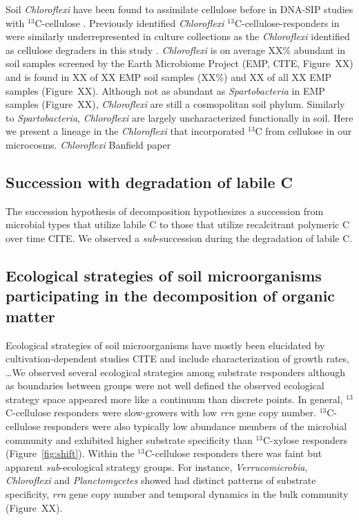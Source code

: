 Soil \textit{Chloroflexi} have been found to assimilate cellulose before in
DNA-SIP studies with $^{13}$C-cellulose \citep{Schellenberger_2010}. Previously
identified \textit{Chloroflexi} $^{13}$C-cellulose-responders in were similarly
underrepresented in culture collections as the \textit{Chloroflexi} identified
as cellulose degraders in this study \citep{Schellenberger_2010}.
\textit{Chloroflexi} is on average XX\% abundant in soil samples screened by
the Earth Microbiome Project (EMP, CITE, Figure~XX) and is found in XX of XX
EMP soil samples (XX\%) and XX of all XX EMP samples (Figure~XX). Although not
as abundant as \textit{Spartobacteria} in EMP samples (Figure~XX),
\textit{Chloroflexi} are still a cosmopolitan soil phylum. Similarly to
\textit{Spartobacteria}, \textit{Chloroflexi} are largely uncharacterized
functionally in soil. Here we present a lineage in the \textit{Chloroflexi}
that incorporated $^{13}$C from cellulose in our microcosms.
\textit{Chloroflexi} Banfield paper

\subsection{Succession with degradation of labile C}
\label{sub:succession_with_degradation_of_labile_c}
The succession hypothesis of decomposition hypothesizes a succession from
microbial types that utilize labile C to those that utilize recalcitrant
polymeric C over time CITE. We observed a \textit{sub}-succession during the 
degradation of labile C. 

\subsection{Ecological strategies of soil microorganisms participating in the
    decomposition of organic matter}
\label{sub:ecological_strategies}
Ecological strategies of soil microorganisms have mostly been elucidated by
cultivation-dependent studies CITE and include characterization of growth
rates, \ldots  We observed several ecological strategies among substrate
responders although as boundaries between groups were not well defined the
observed ecological strategy space appeared more like a continuum than discrete
points. In general, $^{13}$C-cellulose responders were slow-growers with low
\textit{rrn} gene copy number. $^{13}$C-cellulose responders were also
typically low abundance members of the microbial community and exhibited higher
substrate specificity than $^{13}$C-xylose responders (Figure~\ref{fig:shift}).
Within the $^{13}$C-cellulose responders there was faint but apparent
\textit{sub}-ecological strategy groups. For instance,
\textit{Verrucomicrobia}, \textit{Chloroflexi} and \textit{Planctomycetes}
showed had distinct patterns of substrate specificity, \textit{rrn} gene copy
number and temporal dynamics in the bulk community (Figure~XX).

